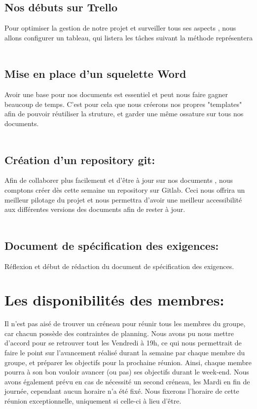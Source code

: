 \documentclass[a4paper, 12pt]{article}
\begin{document}
 \subsection{Nos débuts sur Trello} Pour optimiser la gestion de notre projet et surveiller tous ses aspects , nous allons configurer un tableau, qui listera les tâches suivant la méthode représentera \\ \\
 
\subsection{Mise en place d'un squelette Word}  Avoir une base pour nos documents est essentiel et peut nous faire gagner beaucoup de temps. C'est pour cela que nous créerons nos propres "templates" afin de pouvoir réutiliser la struture, et garder une même ossature sur tous nos documents.
\\ \\

\subsection{Création d'un repository git:} Afin de collaborer plus facilement et d'être à jour sur nos documents , nous comptons créer dès cette semaine un repository sur Gitlab. Ceci nous offrira un meilleur pilotage du projet et nous permettra d'avoir une meilleur accessibilité aux différentes versions des documents afin de rester à jour.\\ \\

\subsection{ Document de spécification des exigences: }
Réflexion et début de rédaction du document de spécification des exigences.

   
\section{Les disponibilités des membres:}
Il n'est pas aisé de trouver un créneau pour réunir tous les membres  du groupe, car chacun possède des contraintes de planning. Nous avons pu nous mettre d'accord pour se retrouver tout les Vendredi à 19h, ce qui nous permettrait de faire le point sur l'avancement réalisé durant la semaine par chaque membre du groupe, et préparer les objectifs pour la prochaine réunion. Ainsi, chaque membre pourra à son bon vouloir avancer (ou pas) ses objectifs durant le week-end.
Nous avons également prévu en cas de nécessité un second créneau, les Mardi en fin de journée, cependant aucun horaire n'a été fixé. Nous fixerons l’horaire de cette réunion exceptionnelle, uniquement si celle-ci à lieu d'être. 
\end{document}
